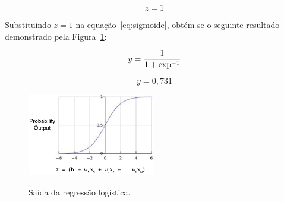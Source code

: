             \begin{equation*}
                z = 1
            \end{equation*}
            
            Substituindo $z = 1$ na equação~\ref{eq:sigmoide}, obtém-se o seguinte resultado demonstrado pela Figura~\ref{fig:probabilidade_output}: 
            
            \begin{equation*} 
                \centering
                y = \frac{1}{1 + \exp^{-1}}
            \end{equation*}
            
            \begin{equation*} 
                y = 0,731
            \end{equation*}
        
            \begin{figure}[H]
                \centering
                \caption{Saída da regressão logística.}
                \includegraphics[width=0.5\textwidth]{fig/2-fundamentacao/aprendizado/probabilidade_output.png}
                \label{fig:probabilidade_output}
            \end{figure}